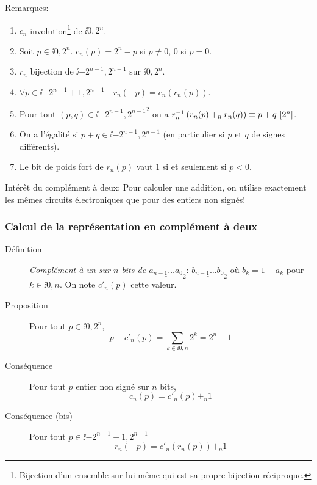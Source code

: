 Remarques:
\begin{enumerate}
\item $c_{n}$ involution\footnote{Bijection
    d'un ensemble sur lui-même qui est sa propre bijection
    réciproque.}
  de $\ii{0,2^{n}}$.
\item Soit $p\in \ii{0,2^{n}}$. $c_{n}(p)=2^{n}-p$ si $p\neq 0$, $0$
  si $p=0$.
\item $r_{n}$  bijection de $\ii{-2^{n-1},2^{n-1}}$ sur
  $\ii{0,2^{n}}$.
\item $\forall p\in \ii{-2^{n-1}+1,2^{n-1}}\quad r_{n}(-p) = c_{n}(r_{n}(p))$.
\item Pour tout $(p,q)\in\ii{-2^{n-1},2^{n-1}}^{2}$ on a
  $r_{n}^{-1}\left( r_{n}(p)+_{n}r_{n}(q)\right) \equiv p+q \ [2^{n}]$.
\item On a l'égalité si $p+q\in \ii{-2^{n-1},2^{n-1}}$ (en
  particulier si $p$ et $q$ de signes différents).
\item Le bit de poids fort de $r_{n}(p)$
  vaut $1$ si et seulement si $p<0$.
\end{enumerate}

Intérêt du complément à deux: Pour calculer une addition, on utilise
exactement les mêmes circuits électroniques que pour des entiers non
signés!

\subsubsection*{Calcul de la représentation en complément à deux}

\begin{description}
\item[Définition] \emph{Complément à un sur $n$ bits de
  $\underline{a_{n-1}\ldots a_{0}}_{2}$}:
  $\underline{b_{n-1}\ldots b_{0}}_{2}$ où $b_{k}=1-a_{k}$ pour
  $k\in\ii{0,n}$. On note $c'_{n}(p)$ cette valeur.
\item[Proposition] Pour tout $p\in\ii{0,2^{n}}$,
  \begin{equation*}
   p + c'_{n}(p) = \sum_{k\in\ii{0,n}}2^{k}= 2^{n}-1 
  \end{equation*}
\item[Conséquence] Pour tout $p$ entier non signé sur $n$ bits,
  \begin{equation*}
    c_{n}(p) = c'_{n}(p) +_{n} 1 
  \end{equation*}
\item[Conséquence (bis)] Pour tout $p\in\ii{-2^{n-1}+1,2^{n-1}}$
  \begin{equation*}
    r_{n}(-p) = c'_{n}(r_{n}(p)) +_{n} 1
  \end{equation*}
\end{description}


